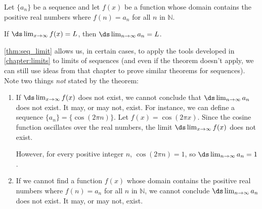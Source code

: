\begin{theorem}\label{thm:seq_limit}%
Let $\{a_n\}$ be a sequence and let $f(x)$ be a function whose domain contains the positive real numbers where $f(n) = a_n$ for all $n$ in $\mathbb{N}$.\bigskip

If $\ds \lim_{x\to\infty} f(x) = L$, then $\ds\lim_{n\to\infty} a_n = L$.
\end{theorem}

\autoref{thm:seq_limit} allows us, in certain cases, to apply the tools developed in \autoref{chapter:limits} to limits of sequences (and even if the theorem doesn't apply, we can still use ideas from that chapter to prove similar theorems for sequences). Note two things \emph{not} stated by the theorem:
	\begin{enumerate}
		\item If $\ds \lim_{x\to\infty}f(x)$ does not exist, we cannot conclude that $\ds\lim_{n\to\infty} a_n$ does not exist. It may, or may not, exist. For instance, we can define a sequence $\{a_n\} = \{\cos(2\pi n)\}$. Let $f(x) = \cos (2\pi x)$. Since the cosine function oscillates over the real numbers, the limit $\ds \lim_{x\to\infty}f(x)$ does not exist. 
		
		However, for every positive integer $n$, $\cos(2\pi n) = 1$, so $\ds \lim_{n\to\infty} a_n = 1$.
		
		\item	If we cannot find a function $f(x)$ whose domain contains the positive real numbers where $f(n) = a_n$ for all $n$ in $\mathbb{N}$, we cannot conclude $\ds\lim_{n\to\infty} a_n$ does not exist. It may, or may not, exist.
	\end{enumerate}


